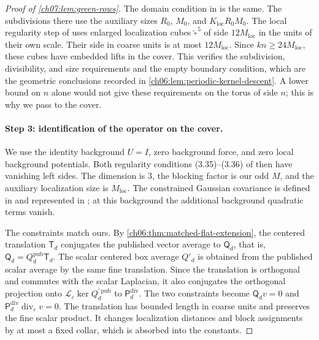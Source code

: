 \begin{proof}[Proof of \cref{ch07:lem:green-rows}]
The domain condition in \cite[Section~A, p.~393]{Balaban1985Background} is the same. The subdivisions there use the auxiliary sizes $R_0$, $M_0$, and $K_{\mathrm{loc}}R_0M_0$. The local regularity step of \cite[Section~C, pp.~408--409]{Balaban1985Background} uses enlarged localization cubes $\widetilde\square^{\,5}$ of side $12M_{\mathrm{loc}}$ in the units of their own scale. Their side in coarse units is at most $12M_{\mathrm{loc}}$. Since $kn\ge24M_{\mathrm{loc}}$, these cubes have embedded lifts in the cover. This verifies the subdivision, divisibility, and size requirements and the empty boundary condition, which are the geometric conclusions recorded in \cref{ch06:lem:periodic-kernel-descent}. A lower bound on $n$ alone would not give these requirements on the torus of side $n$; this is why we pass to the cover.

\paragraph{Step 3: identification of the operator on the cover.}
We use the identity background $U=I$, zero background force, and zero local background potentials. Both regularity conditions (3.35)--(3.36) of \cite[pp.~396--397]{Balaban1985Background} then have vanishing left sides. The dimension is $3$, the blocking factor is our odd $M$, and the auxiliary localization size is $M_{\mathrm{loc}}$. The constrained Gaussian covariance is defined in \cite[(3.148), p.~425]{Balaban1985Background} and represented in \cite[(3.153), p.~426]{Balaban1985Background}; at this background the additional background quadratic terms vanish.

The constraints match ours. By \cref{ch06:thm:matched-flat-extension}, the centered translation $\mathsf T_d$ conjugates the published vector average to $\mathsf Q_d$, that is, $\mathsf Q_d=Q_d^{\mathrm{pub}}\mathsf T_d$. The scalar centered box average $Q'_d$ is obtained from the published scalar average by the same fine translation. Since the translation is orthogonal and commutes with the scalar Laplacian, it also conjugates the orthogonal projection onto $\mathscr L_\varepsilon\ker Q_d^{\prime\,\mathrm{pub}}$ to $\mathsf P_d^{\mathrm{div}}$. The two constraints become $\mathsf Q_dv=0$ and $\mathsf P_d^{\mathrm{div}}\operatorname{div}_\varepsilon v=0$. The translation has bounded length in coarse units and preserves the fine scalar product. It changes localization distances and block assignments by at most a fixed collar, which is absorbed into the constants.


\end{proof}

